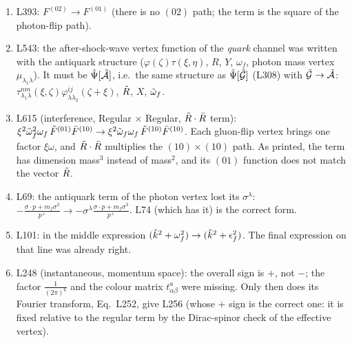 \documentclass[9pt]{article}
\numberwithin{equation}{section}
\begin{document}
\begin{enumerate}
    \item L393: $F^{(02)}\rightarrow F^{(01)}$ (there is no $(02)$ path; the term is the square of the photon-flip path).
    \item L543: the after-shock-wave vertex function of the \emph{quark} channel was written with the antiquark structure ($\varphi(\zeta)\tau(\xi,\eta)$, $R$, $Y$, $\omega_{f}$, photon mass vertex $\mu_{\lambda_{1}\lambda}$). It must be $\Tilde{\Psi}[\Tilde{\mathcal{A}}]$, i.e.\ the same structure as $\Tilde{\Psi}[\Tilde{\mathcal{G}}]$ (L308) with $\Tilde{\mathcal{G}}\rightarrow\Tilde{\mathcal{A}}$: $\tau^{nm}_{\lambda_{1}\lambda}(\xi,\zeta)\varphi^{ij}_{\lambda\lambda_{2}}(\zeta+\xi)$, $\Tilde{R}$, $X$, $\Tilde{\omega}_{f}$.
    \item L615 (interference, Regular $\times$ Regular, $\Tilde{R}\cdot\Bar{R}$ term): $\xi^{2}\Tilde{\omega}^{2}_{f}\omega_{f}\,\Tilde{F}^{(01)}\Bar{F}^{(10)}\rightarrow\xi^{2}\Tilde{\omega}_{f}\omega_{f}\,\Tilde{F}^{(10)}\Bar{F}^{(10)}$. Each gluon-flip vertex brings one factor $\xi\omega$, and $\Tilde{R}\cdot\Bar{R}$ multiplies the $(10)\times(10)$ path. As printed, the term has dimension mass$^{3}$ instead of mass$^{2}$, and its $(01)$ function does not match the vector $\Tilde{R}$.
    \item L69: the antiquark term of the photon vertex lost its $\sigma^{\lambda}$: $-\frac{\sigma\cdot p+m_{f}\sigma^{3}}{p^{+}}\rightarrow-\sigma^{\lambda}\frac{\sigma\cdot p+m_{f}\sigma^{3}}{p^{+}}$. L74 (which has it) is the correct form.
    \item L101: in the middle expression $(\Tilde{k}^{2}+\omega^{2}_{f})\rightarrow(\Tilde{k}^{2}+\epsilon^{2}_{f})$. The final expression on that line was already right.
    \item L248 (instantaneous, momentum space): the overall sign is $+$, not $-$; the factor $\frac{1}{(2\pi)^{6}}$ and the colour matrix $t^{a}_{\alpha\beta}$ were missing. Only then does its Fourier transform, Eq.~L252, give L256 (whose $+$ sign is the correct one: it is fixed relative to the regular term by the Dirac-spinor check of the effective vertex).
\end{enumerate}
\end{document}
